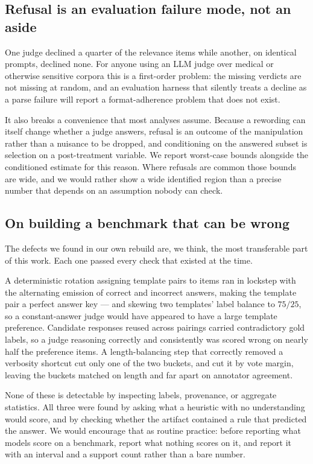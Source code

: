 \subsection{Refusal is an evaluation failure mode, not an aside}

One judge declined a quarter of the relevance items while another, on identical
prompts, declined none. For anyone using an LLM judge over medical or otherwise
sensitive corpora this is a first-order problem: the missing verdicts are not
missing at random, and an evaluation harness that silently treats a decline as a
parse failure will report a format-adherence problem that does not exist.

It also breaks a convenience that most analyses assume. Because a rewording can
itself change whether a judge answers, refusal is an outcome of the manipulation
rather than a nuisance to be dropped, and conditioning on the answered subset is
selection on a post-treatment variable. We report worst-case bounds alongside the
conditioned estimate for this reason. Where refusals are common those bounds are
wide, and we would rather show a wide identified region than a precise number
that depends on an assumption nobody can check.

\subsection{On building a benchmark that can be wrong}

The defects we found in our own rebuild are, we think, the most transferable part
of this work. Each one passed every check that existed at the time.

A deterministic rotation assigning template pairs to items ran in lockstep with
the alternating emission of correct and incorrect answers, making the template
pair a perfect answer key --- and skewing two templates' label balance to
$75/25$, so a constant-answer judge would have appeared to have a large
template preference. Candidate responses reused across pairings carried
contradictory gold labels, so a judge reasoning correctly and consistently was
scored wrong on nearly half the preference items. A length-balancing step that
correctly removed a verbosity shortcut cut only one of the two buckets, and cut
it by vote margin, leaving the buckets matched on length and far apart on
annotator agreement.

None of these is detectable by inspecting labels, provenance, or aggregate
statistics. All three were found by asking what a heuristic with no understanding
would score, and by checking whether the artifact contained a rule that predicted
the answer. We would encourage that as routine practice: before reporting what
models score on a benchmark, report what nothing scores on it, and report it
with an interval and a support count rather than a bare number.

